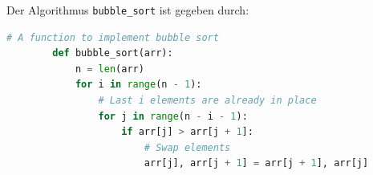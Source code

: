 \begin{questions}
	\question Der Algorithmus \lstinline|bubble_sort| ist gegeben durch:
	\begin{lstlisting}[language=Python]
		# A function to implement bubble sort
		def bubble_sort(arr):
			n = len(arr)
			for i in range(n - 1):
				# Last i elements are already in place
				for j in range(n - i - 1):
					if arr[j] > arr[j + 1]:
						# Swap elements
						arr[j], arr[j + 1] = arr[j + 1], arr[j]
	\end{lstlisting}
\end{questions}
